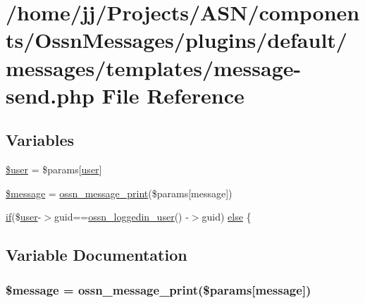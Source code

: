 \hypertarget{message-send_8php}{}\section{/home/jj/\+Projects/\+A\+S\+N/components/\+Ossn\+Messages/plugins/default/messages/templates/message-\/send.php File Reference}
\label{message-send_8php}
\subsection*{Variables}
\begin{DoxyCompactItemize}
\item 
\hyperlink{message-send_8php_a598ca4e71b15a1313ec95f0df1027ca5}{\$user} = \$params\mbox{[}\textquotesingle{}\hyperlink{ossn_8config_8db_8example_8php_a802544b7ba9f79bbf24ef67773d53bed}{user}\textquotesingle{}\mbox{]}
\item 
\hyperlink{message-send_8php_abf17cb2dba2ed17cb28aa5f37deb5293}{\$message} = \hyperlink{_ossn_messages_2ossn__com_8php_a27fd4a27b4ea1055b716471258f29476}{ossn\+\_\+message\+\_\+print}(\$params\mbox{[}\textquotesingle{}message\textquotesingle{}\mbox{]})
\item 
\hyperlink{jquery_8tokeninput_8js_ad8dd46a3cbc004569e34401e9e71771a}{if}(\$\hyperlink{ossn_8config_8db_8example_8php_a802544b7ba9f79bbf24ef67773d53bed}{user}-\/$>$guid==\hyperlink{ossn_8lib_8users_8php_aa3c8068d0e6638b414d6a2f6c62565b8}{ossn\+\_\+loggedin\+\_\+user}() -\/$>$guid) \hyperlink{message-send_8php_a5ab30da07348e5b39dc43c2afa6631c2}{else} \{
\end{DoxyCompactItemize}


\subsection{Variable Documentation}
\subsubsection[{\texorpdfstring{\$message}{$message}}]{\setlength{\rightskip}{0pt plus 5cm}\$message = {\bf ossn\+\_\+message\+\_\+print}(\$params\mbox{[}\textquotesingle{}message\textquotesingle{}\mbox{]})}\hypertarget{message-send_8php_abf17cb2dba2ed17cb28aa5f37deb5293}{}\label{message-send_8php_abf17cb2dba2ed17cb28aa5f37deb5293}


